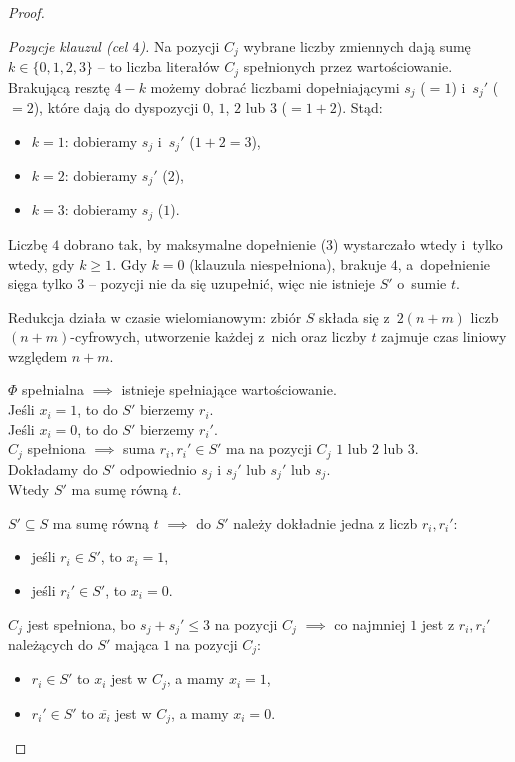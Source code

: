 \begin{proof}
\begin{dygresja}
		\emph{Pozycje klauzul (cel $4$).} Na pozycji $C_j$ wybrane liczby zmiennych dają sumę $k \in \{0, 1, 2, 3\}$ -- to liczba literałów $C_j$ spełnionych przez wartościowanie. Brakującą resztę $4 - k$ możemy dobrać liczbami dopełniającymi $s_j$ ($=1$) i~$s_j'$ ($=2$), które dają do dyspozycji $0$, $1$, $2$ lub $3$ ($= 1 + 2$). Stąd:
		\begin{itemize}[nosep]
			\item $k = 1$: dobieramy $s_j$ i~$s_j'$ ($1 + 2 = 3$),
			\item $k = 2$: dobieramy $s_j'$ ($2$),
			\item $k = 3$: dobieramy $s_j$ ($1$).
		\end{itemize}
		Liczbę $4$ dobrano tak, by maksymalne dopełnienie ($3$) wystarczało wtedy i~tylko wtedy, gdy $k \geq 1$. Gdy $k = 0$ (klauzula niespełniona), brakuje $4$, a~dopełnienie sięga tylko $3$ -- pozycji nie da się uzupełnić, więc nie istnieje $S'$ o~sumie $t$.
	\end{dygresja}

	Redukcja działa w czasie wielomianowym: zbiór $S$ składa się z~$2(n + m)$ liczb $(n + m)$-cyfrowych, utworzenie każdej z~nich oraz liczby $t$ zajmuje czas liniowy względem $n + m$.

	$\Phi$ spełnialna $\implies$ istnieje spełniające wartościowanie.\\
	Jeśli $x_i = 1$, to do $S'$ bierzemy $r_i$.\\
	Jeśli $x_i = 0$, to do $S'$ bierzemy $r_i'$.\\
	$C_j$ spełniona $\implies$ suma $r_i, r_i' \in S'$ ma na pozycji $C_j$ $1$ lub $2$ lub $3$.\\
	Dokładamy do $S'$ odpowiednio $s_j$ i $s_j'$ lub $s_j'$ lub $s_j$.\\
	Wtedy $S'$ ma sumę równą $t$.

	$S' \subseteq S$ ma sumę równą $t$ $\implies$ do $S'$ należy dokładnie jedna z liczb $r_i, r_i'$:
	\begin{itemize}[nosep]
		\item jeśli $r_i \in S'$, to $x_i = 1$,
		\item jeśli $r_i' \in S'$, to $x_i = 0$.
	\end{itemize}
	$C_j$ jest spełniona, bo $s_j + s_j' \leq 3$ na pozycji $C_j$ $\implies$ co najmniej $1$ jest z $r_i, r_i'$ należących do $S'$ mająca $1$ na pozycji $C_j$:
	\begin{itemize}[nosep]
		\item $r_i \in S'$ to $x_i$ jest w $C_j$, a mamy $x_i = 1$,
		\item $r_i' \in S'$ to $\overline{x_i}$ jest w $C_j$, a mamy $x_i = 0$.
	\end{itemize}
\end{proof}

